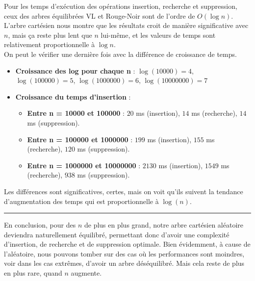 \documentclass[a4paper,12pt]{report}
\begin{document}
\begin{tcolorbox}[colback=gray!10, colframe=blue!30, coltitle=black, title=Analyse des métriques - 2/2]

    Pour les temps d'exécution des opérations insertion, recherche et suppression, ceux des arbres équilibrées VL et Rouge-Noir sont de l'ordre de \( O(\log n) \).\\
    
    L'arbre cartésien nous montre que les résultats croit de manière significative avec \( n \), mais ça reste plus lent que \( n \) lui-même, et les valeurs de temps
        sont relativement proportionnelle à \( \log n \). \\
    
    On peut le vérifier une dernière fois avec la différence de croissance de temps.\\[-0.4cm]
    \begin{itemize}
        \item \textbf{Croissance des log pour chaque n} : \(\log(10000) = 4\), \(\log(100000) = 5\), \(\log(1000000) = 6\), \(\log(10000000) = 7\)\\[-0.3cm]
        \item \textbf{Croissance du temps d'insertion } :
        \begin{itemize}
            \item \textbf{Entre n = 10000 et 100000} : \( 20 \) ms (insertion), \( 14 \) ms (recherche), \( 14 \) ms (suppression).
            \item \textbf{Entre n = 100000 et 1000000} : \( 199 \) ms (insertion), \( 155 \) ms (recherche), \( 120 \) ms (suppression).
            \item \textbf{Entre n = 1000000 et 10000000} : \( 2130 \) ms (insertion), \( 1549 \) ms (recherche), \( 938 \) ms (suppression).
        \end{itemize}
    \end{itemize}

    \vspace{0.5cm}

    Les différences sont significatives, certes, mais on voit qu'ils suivent la tendance d'augmentation des temps qui est proportionnelle à \( \log(n) \).

    \vspace{0.5cm}
    \hrule
    \vspace{0.5cm}

    En conclusion, pour des \( n \) de plus en plus grand, notre arbre cartésien aléatoire deviendra naturellement équilibré, permettant donc d'avoir une 
        complexité d'insertion, de recherche et de suppression optimale. Bien évidemment, à cause de l'aléatoire, nous pouvons tomber sur des cas où les performances 
        sont moindres, voir dans les cas extrêmes, d'avoir un arbre déséquilibré. Mais cela reste de plus en plus rare, quand \( n \) augmente.

\end{tcolorbox}
\end{document}
